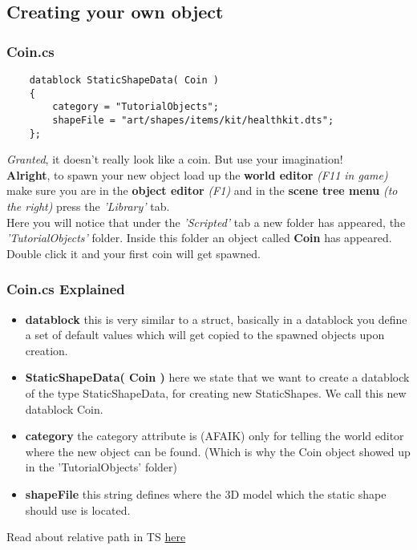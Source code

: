 \subsection*{Creating your own object}
\begin{frame}[fragile]
	\frametitle{Coin.cs}
	{\TS
	\begin{lstlisting}
	datablock StaticShapeData( Coin )
	{
	    category = "TutorialObjects";
	    shapeFile = "art/shapes/items/kit/healthkit.dts";
	};
	\end{lstlisting}}
	{\it Granted}, it doesn't really look like a coin. But use your imagination!\\
	{\bf Alright}, to spawn your new object load up the {\bf world editor} {\it (F11 in game)} make sure you are in the {\bf object editor} {\it (F1)} and in the {\bf scene tree menu} {\it (to the right)} press the {\it 'Library'} tab.\\
	Here you will notice that under the {\it 'Scripted'} tab a new folder has appeared, the {\it 'TutorialObjects'} folder. Inside this folder an object called {\bf Coin} has appeared.\\ Double click it and your first coin will get spawned.
\end{frame}

\begin{frame}[fragile]
	\frametitle{Coin.cs Explained}
	\begin{itemize}
	\item {\bf datablock} this is very similar to a struct, 
			basically in a datablock you define a set of default values which 
			will get copied to the spawned objects upon creation.
	\item {\bf StaticShapeData( Coin )} here we state that we want to create a datablock of the
			type StaticShapeData, for creating new StaticShapes. We call this new datablock Coin.
	\item {\bf category} the category attribute is (AFAIK) only for telling the world editor
			where the new object can be found. (Which is why the Coin object showed up in the 'TutorialObjects' folder)
	\item {\bf shapeFile} this string defines where the 3D model which the static shape should use is located. 
	\end{itemize}
	Read about relative path in TS {\color{blue}\hyperlink{QG-Paths}{here}}
\end{frame}

